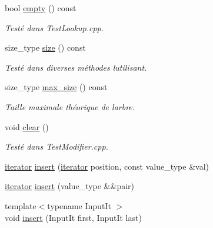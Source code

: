 \begin{DoxyCompactItemize}
\item 
\mbox{\label{classMultimap_a50846e3c6ae86f987ab0cba0509f204e}} 
bool \hyperlink{classMultimap_a50846e3c6ae86f987ab0cba0509f204e}{empty} () const
\begin{DoxyCompactList}\small\item\em Testé dans Test\+Lookup.\+cpp. \end{DoxyCompactList}\item 
\mbox{\label{classMultimap_a159de5dca46aeb29f074c6414af7bb3a}} 
size\+\_\+type \hyperlink{classMultimap_a159de5dca46aeb29f074c6414af7bb3a}{size} () const
\begin{DoxyCompactList}\small\item\em Testé dans diverses méthodes l\textquotesingle{}utilisant. \end{DoxyCompactList}\item 
\mbox{\label{classMultimap_a9c0f70d780a722bee16bbb246fb62d8b}} 
size\+\_\+type \hyperlink{classMultimap_a9c0f70d780a722bee16bbb246fb62d8b}{max\+\_\+size} () const
\begin{DoxyCompactList}\small\item\em Taille maximale théorique de l\textquotesingle{}arbre. \end{DoxyCompactList}\item 
\mbox{\label{classMultimap_a6ca5068eecc98e16fbf0627db87e3742}} 
void \hyperlink{classMultimap_a6ca5068eecc98e16fbf0627db87e3742}{clear} ()
\begin{DoxyCompactList}\small\item\em Testé dans Test\+Modifier.\+cpp. \end{DoxyCompactList}\item 
\hyperlink{classMultimapIterator}{iterator} \hyperlink{classMultimap_a0a507d3094aaa271c3f5932c9acef378}{insert} (\hyperlink{classMultimapIterator}{iterator} position, const value\+\_\+type \&val)
\item 
\hyperlink{classMultimapIterator}{iterator} \hyperlink{classMultimap_aef5529b0f81f2262e6a9de27a5e47389}{insert} (value\+\_\+type \&\&pair)
\item 
{\footnotesize template$<$typename Input\+It $>$ }\\void \hyperlink{classMultimap_a62ba469ffdf46652eaa8ac007c590031}{insert} (Input\+It first, Input\+It last)

\end{DoxyCompactItemize}
